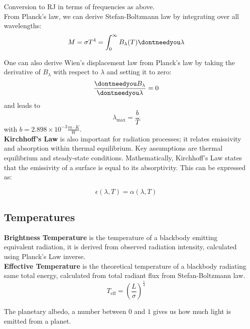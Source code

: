 \documentclass[12pt, a4paper]{article} %
\let\d\dontneedyou
\DeclareMathOperator{\d}{d}
\begin{document}
Conversion to RJ in terms of frequencies as above. \\

From Planck's law, we can derive Stefan-Boltzmann law by integrating over all wavelengths:
\begin{equation}
	M = \sigma T^4 = \int_0^\infty B_\lambda(T) \d \lambda
\end{equation}

One can also derive Wien's displacement law from Planck's law by taking the derivative of $B_\lambda$ with respect to $\lambda$ and setting it to zero:
\begin{equation}
	\frac{\d B_\lambda}{\d \lambda} = 0
\end{equation}
and leads to
\begin{equation}
	\lambda_{\max} = \frac{b}{T}
\end{equation}
with $b = 2.898 \times 10^{-3} \frac{m\cdot K}{W}$. \\

\textbf{Kirchhoff's Law} is also important for radiation processes; it relates emissivity and absorption within thermal equilibrium. Key assumptions are thermal equilibrium and steady-state conditions. Mathematically, Kirchhoff's Law states that the emissivity of a surface is equal to its absorptivity. This can be expressed as:

\begin{equation}
	\epsilon(\lambda, T) = \alpha(\lambda, T)
\end{equation}

\subsection{Temperatures}

\textbf{Brightness Temperature} is the temperature of a blackbody emitting equivalent radiation, it is derived from observed radiation intensity, calculated using Planck's Law inverse. \\


\textbf{Effective Temperature} is the theoretical temperature of a blackbody radiating same total energy, calculated from total radiant flux from Stefan-Boltzmann law.
\begin{equation}
	T_{\text{eff}} = \left(\frac{L}{\sigma}\right)^{\frac{1}{4}}
\end{equation}

The planetary albedo, a number between $0$ and $1$ gives us how much light is emitted from a planet. \\
\end{document}
